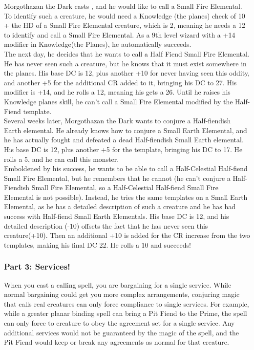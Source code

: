       Morgothazan the Dark casts , and he would like to call a Small Fire Elemental. To identify such a creature, he would need a Knowledge (the planes) check of 10 + the HD of a Small Fire Elemental creature, which is 2, meaning he needs a 12 to identify and call a Small Fire Elemental. As a 9th level wizard with a +14 modifier in Knowledge(the Planes), he automatically succeeds.\\
      The next day, he decides that he wants to call a Half Fiend Small Fire Elemental. He has never seen such a creature, but he knows that it must exist somewhere in the planes. His base DC is 12, plus another +10 for never having seen this oddity, and another +5 for the additional CR added to it, bringing his DC to 27. His modifier is +14, and he rolls a 12, meaning his gets a 26. Until he raises his Knowledge planes skill, he can't call a Small Fire Elemental modified by the Half-Fiend template.\\
      Several weeks later, Morgothazan the Dark wants to conjure a Half-fiendish Earth elemental. He already knows how to conjure a Small Earth Elemental, and he has actually fought and defeated a dead Half-fiendish Small Earth elemental. His base DC is 12, plus another +5 for the template, bringing his DC to 17. He rolls a 5, and he can call this monster.\\
      Emboldened by his success, he wants to be able to call a Half-Celestial Half-fiend Small Fire Elemental, but he remembers that he cannot (he can't conjure a Half-Fiendish Small Fire Elemental, so a Half-Celestial Half-fiend Small Fire Elemental is not possible). Instead, he tries the same templates on a Small Earth Elemental, as he has a detailed description of such a creature and he has had success with Half-fiend Small Earth Elementals. His base DC is 12, and his detailed description (-10) offsets the fact that he has never seen this creature(+10). Then an additional +10 is added for the CR increase from the two templates, making his final DC 22. He rolls a 10 and succeeds!

\subsubsection{Part 3: Services!}
When you cast a calling spell, you are bargaining for a single service. While normal bargaining could get you more complex arrangements, conjuring magic that calls real creatures can only force compliance to single services. For example, while a greater planar binding spell can bring a Pit Fiend to the Prime, the spell can only force to creature to obey the agreement set for a single service. Any additional services would not be guaranteed by the magic of the spell, and the Pit Fiend would keep or break any agreements as normal for that creature.


